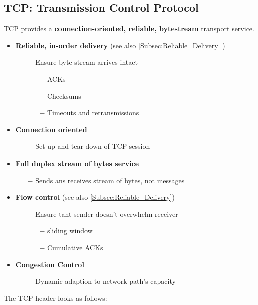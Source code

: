 \documentclass[a4paper, fontsize=8pt, landscape, DIV=1]{scrartcl}
\begin{document}
\begin{multicols*}{4}
		\subsection{TCP: Transmission Control Protocol}
		TCP provides a \textbf{connection-oriented, reliable, bytestream} transport
		service.
		\begin{itemize}[noitemsep]
			\item \textbf{Reliable, in-order delivery} (see also
			\ref{Subsec:Reliable_Delivery} )
			\begin{itemize}
				\item[$-$] Ensure byte stream arrives intact
				\begin{itemize}
					\item[$-$] ACKs
					\item[$-$] Checksums
					\item[$-$] Timeouts and retransmissions	
				\end{itemize}
			\end{itemize}
			\item \textbf{Connection oriented}
			\begin{itemize}
				\item[$-$] Set-up and tear-down of TCP session
			\end{itemize}
			\item \textbf{Full duplex stream of bytes service}
			\begin{itemize}
				\item[$-$] Sends ans receives stream of bytes, not messages
			\end{itemize}
			\item \textbf{Flow control} (see also \ref{Subsec:Reliable_Delivery})
			\begin{itemize}
				\item[$-$] Ensure taht sender doesn't overwhelm receiver
				\begin{itemize}
					\item[$-$] sliding window
					\item[$-$] Cumulative ACKs
				\end{itemize}
			\end{itemize}
			\item \textbf{Congestion Control}
			\begin{itemize}
				\item[$-$] Dynamic adaption to network path's capacity
			\end{itemize}
		\end{itemize}
		The TCP header looks as follows: \\

\end{multicols*}
\end{document}
